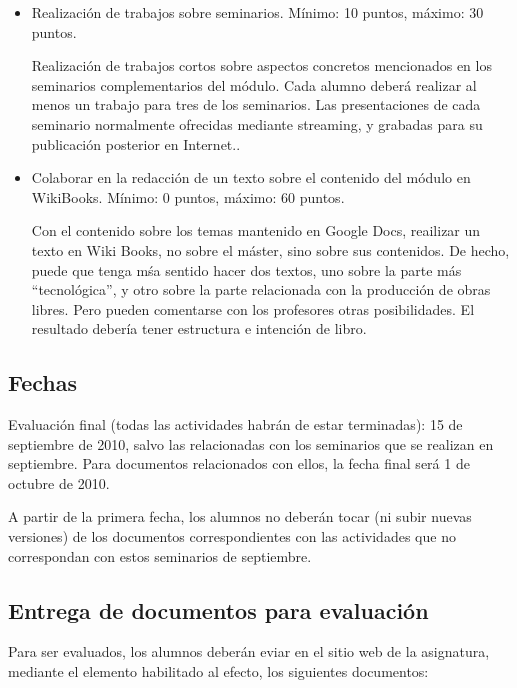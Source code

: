 \documentclass[a4paper,12pt]{article}
\begin{document}
\begin{itemize}
\item Realización de trabajos sobre seminarios. Mínimo: 10 puntos, máximo: 30 puntos.

Realización de trabajos cortos sobre aspectos concretos mencionados en los seminarios complementarios del módulo. Cada alumno deberá realizar al menos un trabajo para tres de los seminarios. Las presentaciones de cada seminario normalmente ofrecidas mediante streaming, y grabadas para su publicación posterior en Internet..

\item Colaborar en la redacción de un texto sobre el contenido del módulo en WikiBooks. Mínimo: 0 puntos, máximo: 60 puntos.

Con el contenido sobre los temas mantenido en Google Docs, reailizar un texto en Wiki Books, no sobre el máster, sino sobre sus contenidos. De hecho, puede que tenga mśa sentido hacer dos textos, uno sobre la parte más ``tecnológica'', y otro sobre la parte relacionada con la producción de obras libres. Pero pueden comentarse con los profesores otras posibilidades. El resultado debería tener estructura e intención de libro.

\end{itemize}

\subsection{Fechas}

Evaluación final (todas las actividades habrán de estar terminadas): 15 de septiembre de 2010, salvo las relacionadas con los seminarios que se realizan en septiembre. Para documentos relacionados con ellos, la fecha final será 1 de octubre de 2010.

A partir de la primera fecha, los alumnos no deberán tocar (ni subir nuevas versiones) de los documentos correspondientes con las actividades que no correspondan con estos seminarios de septiembre.

\subsection{Entrega de documentos para evaluación}

Para ser evaluados, los alumnos deberán eviar en el sitio web de la asignatura, mediante el elemento habilitado al efecto, los siguientes documentos:
\end{document}
